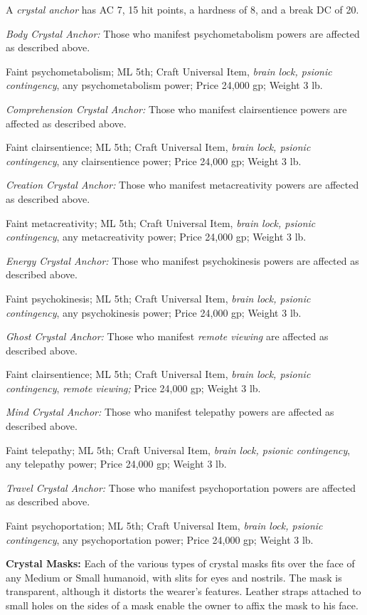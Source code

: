 \documentclass{article}
\begin{document}
A \textit{crystal anchor }has AC 7, 15 hit points, a hardness of 8, and a break 
DC of 20.

\textit{Body Crystal Anchor: }Those who manifest psychometabolism powers are affected 
as described above.

Faint psychometabolism; ML 5th; Craft Universal Item, \textit{brain lock, psionic 
contingency}, any psychometabolism power; Price 24,000 gp; Weight 3 lb.

\textit{Comprehension Crystal Anchor: }Those who manifest clairsentience powers 
are affected as described above.

Faint clairsentience; ML 5th; Craft Universal Item, \textit{brain lock, psionic 
contingency}, any clairsentience power; Price 24,000 gp; Weight 3 lb.

\textit{Creation Crystal Anchor: }Those who manifest metacreativity powers are 
affected as described above.

Faint metacreativity; ML 5th; Craft Universal Item, \textit{brain lock, psionic 
contingency}, any metacreativity power; Price 24,000 gp; Weight 3 lb.

\textit{Energy Crystal Anchor: }Those who manifest psychokinesis powers are affected 
as described above.

Faint psychokinesis; ML 5th; Craft Universal Item, \textit{brain lock, psionic 
contingency}, any psychokinesis power; Price 24,000 gp; Weight 3 lb.

\textit{Ghost Crystal Anchor: }Those who manifest \textit{remote viewing }are affected 
as described above.

Faint clairsentience; ML 5th; Craft Universal Item, \textit{brain lock, psionic 
contingency}, \textit{remote viewing; }Price 24,000 gp; Weight 3 lb.

\textit{Mind Crystal Anchor: }Those who manifest telepathy powers are affected 
as described above.

Faint telepathy; ML 5th; Craft Universal Item, \textit{brain lock, psionic contingency}, 
any telepathy power; Price 24,000 gp; Weight 3 lb.

\textit{Travel Crystal Anchor: }Those who manifest psychoportation powers are affected 
as described above.

Faint psychoportation; ML 5th; Craft Universal Item, \textit{brain lock, psionic 
contingency}, any psychoportation power; Price 24,000 gp; Weight 3 lb.

\textbf{Crystal Masks:} Each of the various types of crystal masks fits over the 
face of any Medium or Small humanoid, with slits for eyes and nostrils. The mask 
is transparent, although it distorts the wearer's features. Leather straps attached 
to small holes on the sides of a mask enable the owner to affix the mask to his 
face.
\end{document}

